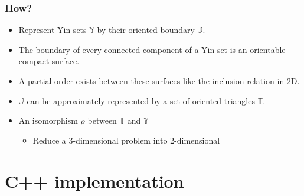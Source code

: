 \documentclass{beamer}
\begin{document}
\begin{frame}
  \frametitle{How?}
  
  \begin{itemize}
  \item Represent Yin sets $\mathbb{Y}$ by their oriented boundary $\mathbb{J}$.
\item The boundary of every connected component of a Yin set is an orientable compact surface.
\item A partial order exists between these surfaces like the inclusion relation in 2D.
  \item $\mathbb{J}$ can be approximately represented by a set of oriented triangles $\mathbb{T}$. 
  \item An isomorphism $\rho$ between $\mathbb{T}$  and $\mathbb{Y}$
    \begin{itemize}
    \item Reduce a 3-dimensional problem into 2-dimensional
    \end{itemize}
    
  \end{itemize}
\end{frame}

\section{C++ implementation}
\end{document}
